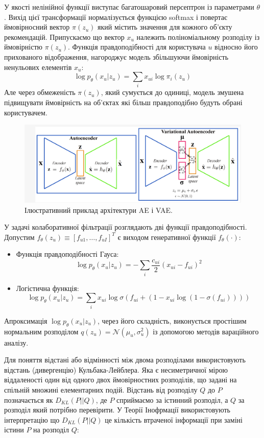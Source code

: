 У якості нелінійної функції виступає багатошаровий персептрон із параметрами $\theta$. Вихід цієї трансформації нормалізується функцією softmax і повертає
ймовірносний вектор $\pi(z_u)$ який містить значення для кожного об’єкту рекомендацій. Припускаємо що вектор $x_u$ належить поліноміальному розподілу із ймовірністю  $\pi(z_u)$. Функція правдоподібності для користувача $u$ відносно його прихованого відображення, нагороджує модель збільшуючи ймовірність ненульових елементів $x_u$:
\[ \log p_{\theta}(x_u|z_u) = \sum_i x_{ui} \log \pi_i(z_u)\]
Але через обмеженість $\pi(z_u)$, який сумується до одиниці, модель змушена підвищувати ймовірність на об’єктах які більш правдоподібно будуть обрані користувачем.
\begin{figure}
    \centering
    \includegraphics[width=1\textwidth]{images/AE.png}
    \caption{Ілюстративний приклад архітектури AE і VAE.}
\end{figure}
У задачі колаборативної фільтрації розглядають дві функції правдоподібності.
Допустим $f_{\theta}(z_u) \equiv [f_{u1}, \ldots, f_{uI}]^{T}$ є виходом генеративної функції $f_{\theta}(\cdot)$:
\begin{itemize}
    \item Функція правдоподібності Гауса:
          \[\log p_{\theta}(x_u|z_u) = - \sum_i \frac{c_{ui}}{2}(x_{ui} - f_{ui})^{2} \]
    \item Логістична функція:
          \[ \log p_{\theta}(x_u|z_u) = \sum_i x_{ui} \log \sigma(f_{ui} + (1 - x_{ui} \log(1 - \sigma(f_{ui}))))\]
\end{itemize}

Апроксимація $\log p_{\theta}(x_u|z_u)$, через його складність, виконується простішим нормальним розподілом $q(z_u) = \mathcal{N}(\mu_u, \sigma^{2}_u )$ із допомогою методів вараційного аналізу.

Для поняття відстані або відмінності між двома розподілами використовують відстань (дивергенцію) Кульбака-Лейблера. Яка є несиметричної мірою віддаленості один від одного двох ймовірностних розподілів, що задані на спільній множині елементарних подій. Відстань від розподілу $Q$ до $P$  позначається як $D_{KL}(P||Q)$, де $P$ сприймаємо за істинний розподіл, а $Q$ за розподіл який потрібно перевірити. У Теорії Інофрмації використовують інтерпретацію що $D_{KL}(P||Q)$ це кількість втраченої інформації при заміні істини $P$ на розподіл  $Q$:


